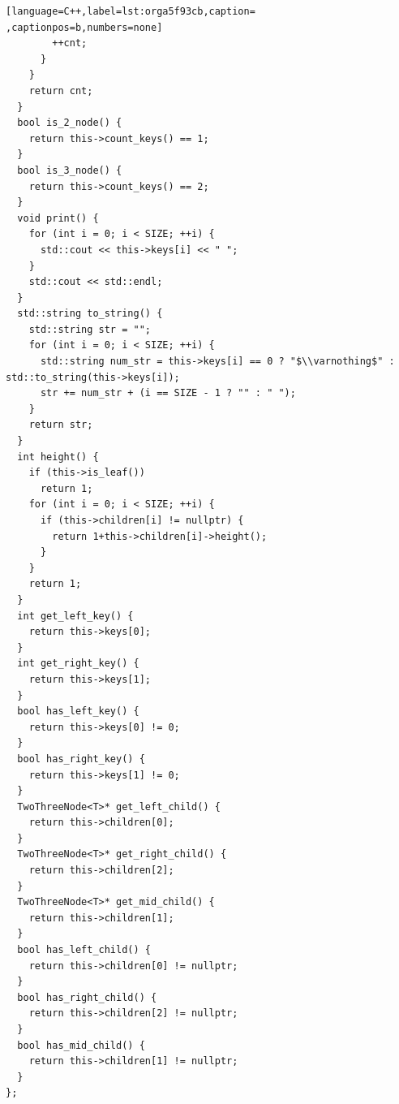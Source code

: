 \documentclass[a4paper,12pt]{article}
\begin{document}
\begin{lstlisting}[language=C++,label=lst:orga5f93cb,caption= ,captionpos=b,numbers=none]
        ++cnt;
      }
    }
    return cnt;
  }
  bool is_2_node() {
    return this->count_keys() == 1;
  }
  bool is_3_node() {
    return this->count_keys() == 2;
  }
  void print() {
    for (int i = 0; i < SIZE; ++i) {
      std::cout << this->keys[i] << " ";
    }
    std::cout << std::endl;
  }
  std::string to_string() {
    std::string str = "";
    for (int i = 0; i < SIZE; ++i) {
      std::string num_str = this->keys[i] == 0 ? "$\\varnothing$" : std::to_string(this->keys[i]);
      str += num_str + (i == SIZE - 1 ? "" : " ");
    }
    return str;
  }
  int height() {
    if (this->is_leaf())
      return 1;
    for (int i = 0; i < SIZE; ++i) {
      if (this->children[i] != nullptr) {
        return 1+this->children[i]->height();
      }
    }
    return 1;
  }
  int get_left_key() {
    return this->keys[0];
  }
  int get_right_key() {
    return this->keys[1];
  }
  bool has_left_key() {
    return this->keys[0] != 0;
  }
  bool has_right_key() {
    return this->keys[1] != 0;
  }
  TwoThreeNode<T>* get_left_child() {
    return this->children[0];
  }
  TwoThreeNode<T>* get_right_child() {
    return this->children[2];
  }
  TwoThreeNode<T>* get_mid_child() {
    return this->children[1];
  }
  bool has_left_child() {
    return this->children[0] != nullptr;
  }
  bool has_right_child() {
    return this->children[2] != nullptr;
  }
  bool has_mid_child() {
    return this->children[1] != nullptr;
  }
};
\end{lstlisting}
\end{document}
